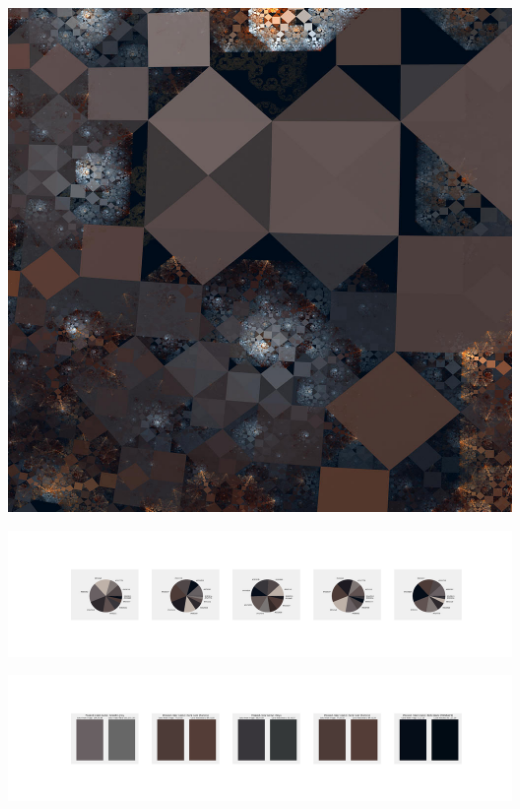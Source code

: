 \documentclass[11pt]{article}
\begin{document}
\begin{landscape}
    \begin{center}
    \includegraphics[width=\textwidth]{./nbimg/file (217).jpg}
    \end{center}

    \begin{center}
    \includegraphics[width=250mm]{./nbimg/pie-131.jpg}
    \end{center}

    \begin{center}
    \includegraphics[width=250mm]{./nbimg/peak-131.jpg}
    \end{center}
    


\end{landscape}
\end{document}

